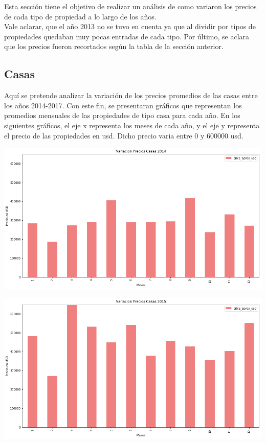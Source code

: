 \documentclass[a4paper, 10pt]{article}
\begin{document}
			Esta sección tiene el objetivo de realizar un análisis de como variaron los precios de cada tipo de propiedad a lo largo de los años.\\
			Vale aclarar, que el año 2013 no se tuvo en cuenta ya que al dividir por tipos de propiedades quedaban muy pocas entradas de cada tipo.
			Por último, se aclara que los precios fueron recortados según la tabla de la sección anterior.

			\subsection{Casas}

			Aquí se pretende analizar la variación de los precios promedios de las casas entre los años 2014-2017. Con este fin, se presentaran gráficos que representan los promedios mensuales de las propiedades de tipo casa para cada año. En los siguientes gráficos, el eje x representa los meses de cada año, y el eje y representa el precio de las propiedades en usd. Dicho
precio varia entre 0 y 600000 usd.

			\begin{center}
   		    		\includegraphics[width=\textwidth]{images/vCasa2014}
			\end{center}

			\begin{center}
   		    		\includegraphics[width=\textwidth]{images/vCasa2015}
			\end{center}
\end{document}
